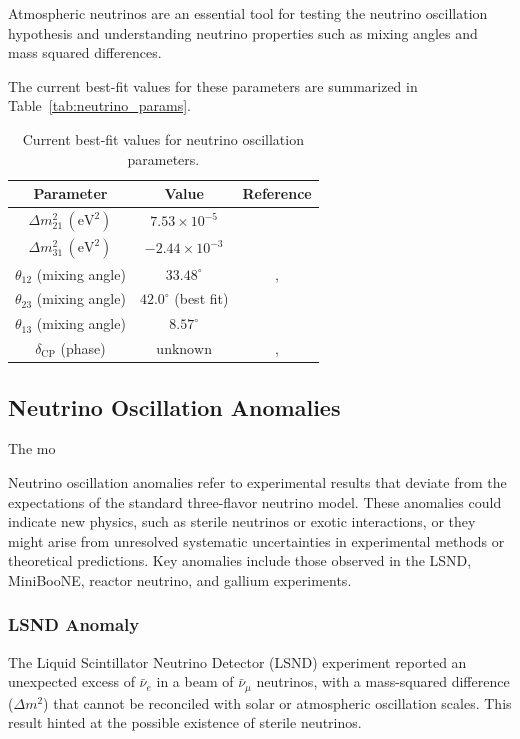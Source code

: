 \documentclass[a4paper,12pt,numbered]{article}
\begin{document}
Atmospheric neutrinos are an essential tool for testing the neutrino oscillation hypothesis and understanding neutrino properties such as mixing angles and mass squared differences.


The current best-fit values for these parameters are summarized in Table~\ref{tab:neutrino_params}.

\begin{table}[h!]
\centering
\begin{tabular}{|c|c|c|}
\hline
\textbf{Parameter} & \textbf{Value} & \textbf{Reference} \\
\hline
\(\Delta m^2_{21} \, (\text{eV}^2)\) & \(7.53 \times 10^{-5}\) & \cite{Fogli_2012} \\
\(\Delta m^2_{31} \, (\text{eV}^2)\) & \(-2.44 \times 10^{-3}\) & \cite{Fogli_2012} \\
\(\theta_{12}\) (mixing angle) & \(33.48^\circ\) & \cite{Fogli_2012}, \cite{Fukuda_2002} \\
\(\theta_{23}\) (mixing angle) & \(42.0^\circ\) (best fit) & \cite{T2K_2023} \\
\(\theta_{13}\) (mixing angle) & \(8.57^\circ\) & \cite{T2K_2023} \\
\(\delta_{\text{CP}}\) (phase) & \( \text{unknown} \) & \cite{Fogli_2012}, \cite{T2K_2023} \\
\hline
\end{tabular}
\caption{Current best-fit values for neutrino oscillation parameters.}
\end{table}

\subsection{Neutrino Oscillation Anomalies}

The mo

Neutrino oscillation anomalies refer to experimental results that deviate from the expectations of the standard three-flavor neutrino model. These anomalies could indicate new physics, such as sterile neutrinos or exotic interactions, or they might arise from unresolved systematic uncertainties in experimental methods or theoretical predictions. Key anomalies include those observed in the LSND, MiniBooNE, reactor neutrino, and gallium experiments.

\subsubsection{LSND Anomaly}  
The Liquid Scintillator Neutrino Detector (LSND) experiment reported an unexpected excess of $\bar{\nu}_e$ in a beam of $\bar{\nu}_\mu$ neutrinos, with a mass-squared difference ($\Delta m^2$) that cannot be reconciled with solar or atmospheric oscillation scales. This result hinted at the possible existence of sterile neutrinos.
\end{document}
